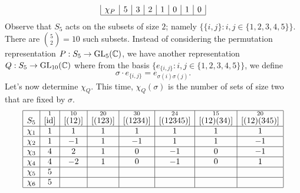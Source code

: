 \begin{exmp}{}
\begin{align*}
\begin{array}{|c|c|c|c|c|c|c|c|}
            \chi_P & 5                  & 3                    & 2                     & 1                      & 0                       & 1                        & 0                         \\ \hline 
        \end{array} 
    \end{align*}
    Observe that $S_5$ acts on the subsets of size $2$; namely 
    $\{\{i, j\} : i, j \in \{1, 2, 3, 4, 5\}\}$. There are $\binom{5}{2} = 10$ 
    such subsets. Instead of considering the permutation representation 
    $P : S_5 \to \operatorname{GL}_5(\mathbb{C})$, we have another representation 
    $Q : S_5 \to \operatorname{GL}_{10}(\mathbb{C})$ where from the basis $\{e_{\{i,j\}} : 
    i, j \in \{1, 2, 3, 4, 5\}\}$, we define 
    \[ \sigma \cdot e_{\{i,j\}} = e_{\sigma(i)\sigma(j)}. \] 
    Let's now determine $\chi_Q$. This time, $\chi_Q(\sigma)$ is the number of sets 
    of size two that are fixed by $\sigma$. 
    \begin{align*}
        \begin{array}{|c|c|c|c|c|c|c|c|}
            \hline
            S_5    & \overset{1}{[\operatorname{id}]} & \overset{10}{[(12)]} & \overset{20}{[(123)]} & \overset{30}{[(1234)]} & \overset{24}{[(12345)]} & \overset{15}{[(12)(34)]} & \overset{20}{[(12)(345)]} \\ \hline
            \chi_1 & 1                  & 1                    & 1                     & 1                      & 1                       & 1                        & 1                         \\ \hline
            \chi_2 & 1                  & -1                   & 1                     & -1                     & 1                       & 1                        & -1                        \\ \hline
            \chi_3 & 4                  & 2                    & 1                     & 0                      & -1                      & 0                        & -1                        \\ \hline
            \chi_4 & 4                  & -2                   & 1                     & 0                      & -1                      & 0                        & 1                         \\ \hline
            \chi_5 & 5                  &                      &                       &                        &                         &                          &                           \\ \hline
            \chi_6 & 5                  &                      &                       &                        &                         &                          &                           \\ \hline

\end{array}
\end{align*}
\end{exmp}
